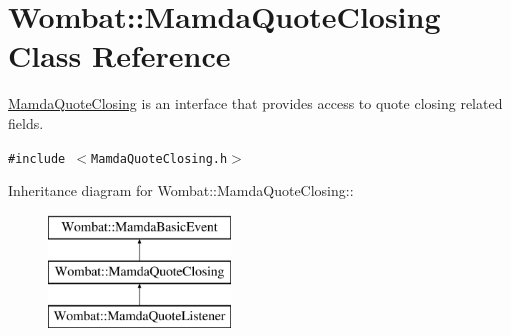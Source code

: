 \hypertarget{classWombat_1_1MamdaQuoteClosing}{
\section{Wombat::Mamda\-Quote\-Closing Class Reference}
\label{classWombat_1_1MamdaQuoteClosing}
}
\hyperlink{classWombat_1_1MamdaQuoteClosing}{Mamda\-Quote\-Closing} is an interface that provides access to quote closing related fields.  


{\tt \#include $<$Mamda\-Quote\-Closing.h$>$}

Inheritance diagram for Wombat::Mamda\-Quote\-Closing::\begin{figure}[H]
\begin{center}
\leavevmode
\includegraphics[height=3cm]{classWombat_1_1MamdaQuoteClosing}
\end{center}
\end{figure}
